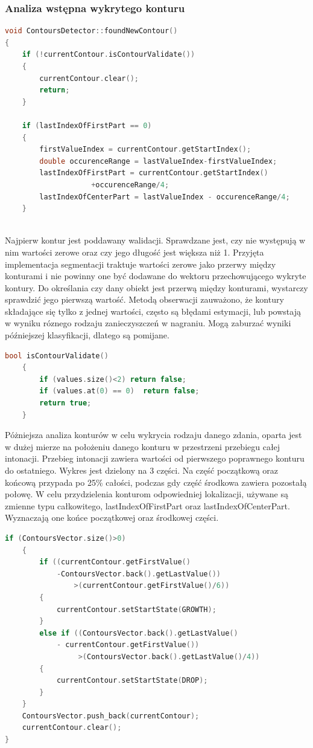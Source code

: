 \documentclass[a4paper,12 pt]{article}
\begin{document}
\subsubsection{Analiza wstępna wykrytego konturu}
\begin{lstlisting}[caption={Funkcja zajmująca się analizą wstępną wykrytego konturu},label={lst:label},language=C++]
void ContoursDetector::foundNewContour()
{
    if (!currentContour.isContourValidate())
    {
        currentContour.clear();
        return;
    }
    
    if (lastIndexOfFirstPart == 0)
    {
        firstValueIndex = currentContour.getStartIndex();
        double occurenceRange = lastValueIndex-firstValueIndex;
        lastIndexOfFirstPart = currentContour.getStartIndex()
					+occurenceRange/4;
        lastIndexOfCenterPart = lastValueIndex - occurenceRange/4;
    }
                
\end{lstlisting}
Najpierw kontur jest poddawany walidacji. Sprawdzane jest, czy nie występują w nim wartości zerowe oraz czy jego długość jest większa niż 1. Przyjęta implementacja segmentacji traktuje wartości zerowe jako przerwy między konturami i nie powinny one być dodawane do wektoru przechowującego wykryte kontury. Do określania czy dany obiekt jest przerwą między konturami, wystarczy sprawdzić jego pierwszą wartość.
Metodą obserwacji zauważono, że kontury składające się tylko z jednej wartości, często są błędami estymacji, lub powstają w wyniku róznego rodzaju zanieczyszczeń w nagraniu. Mogą zaburzać wyniki późniejszej klasyfikacji, dlatego są pomijane.
\begin{lstlisting}[caption={Funkcja dokonująca walidacji konturu},label={lst:label},language=C++]
    bool isContourValidate()
    {
        if (values.size()<2) return false;
        if (values.at(0) == 0)  return false;
        return true;
    }
\end{lstlisting}
Póżniejsza analiza konturów w celu wykrycia rodzaju danego zdania, oparta jest w dużej mierze na położeniu danego konturu w przestrzeni przebiegu całej intonacji. Przebieg intonacji zawiera wartości od pierwszego poprawnego konturu do ostatniego. Wykres jest dzielony na 3 części. Na część początkową oraz końcową przypada po 25\% całości, podczas gdy część środkowa zawiera pozostałą połowę.
W celu przydzielenia konturom odpowiedniej lokalizacji, używane są zmienne typu całkowitego, lastIndexOfFirstPart oraz lastIndexOfCenterPart. Wyznaczają one końce początkowej oraz środkowej części.
\begin{lstlisting}[caption={Dalsza część funkcji foundNewContour},label={lst:label},language=C++]
     if (ContoursVector.size()>0)
    {
        if ((currentContour.getFirstValue()
        	-ContoursVector.back().getLastValue())
                >(currentContour.getFirstValue()/6))
        {
            currentContour.setStartState(GROWTH);
        }
        else if ((ContoursVector.back().getLastValue() 
        	- currentContour.getFirstValue())
                 >(ContoursVector.back().getLastValue()/4))
        {
            currentContour.setStartState(DROP);
        }
    }
    ContoursVector.push_back(currentContour);
    currentContour.clear();
}
\end{lstlisting}
\end{document}
